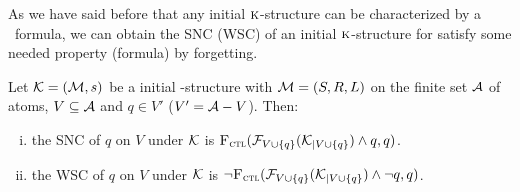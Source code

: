 \documentclass{article}
\begin{document}
 As we have said before that any initial $\textsc{k}$-structure can be characterized by a \CTL\ formula, we can obtain the SNC (WSC) of an initial $\textsc{k}$-structure for satisfy some needed property (formula) by forgetting.
\begin{theorem}\label{thm:inK:SNC}
Let ${\cal K}= ({\cal M}, s)$ be a initial \MPK-structure with ${\cal M}=(S,R,L)$ on the finite set ${\cal A}$ of atoms, $V \subseteq {\cal A}$ and $q\in V'$ ($V' = {\cal A} - V$). Then:
 \begin{enumerate}[(i)]
   \item the SNC of $q$ on $V$ under ${\cal K}$ is ${\textsc{F}_{\textsc{ctl}}}({\cal F}_{V \cup \{q\}}({\cal K}_{|V \cup \{q\}}) \wedge q, q)$.
   \item the WSC of $q$ on $V$ under ${\cal K}$ is $\neg {\textsc{F}_{\textsc{ctl}}}({\cal F}_{V \cup \{q\}}({\cal K}_{|V \cup \{q\}}) \wedge \neg q, q)$.
 \end{enumerate}
\end{theorem}
%
\end{document}
